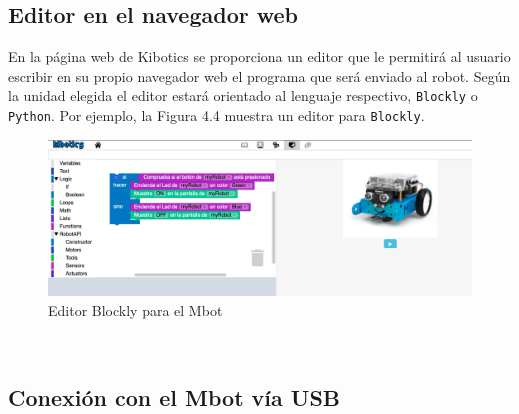 \documentclass{report}
\begin{document}
\subsection{Editor en el navegador web}

En la página web de Kibotics se proporciona un editor que le permitirá al usuario escribir en su propio navegador web el programa que será enviado al robot. Según la unidad elegida el editor estará orientado al lenguaje respectivo, \texttt{Blockly} o \texttt{Python}. Por ejemplo, la Figura 4.4 muestra un editor para \texttt{Blockly}.
\\
\begin{figure}[h!]
  \centering
    \includegraphics[width=1\textwidth]{images/editor_mbot.png}
  \caption{Editor Blockly para el Mbot }
  \label{Editor Blockly para el Mbot }
\end{figure}
\\

\subsection{Conexión con el Mbot vía USB}
\end{document}
